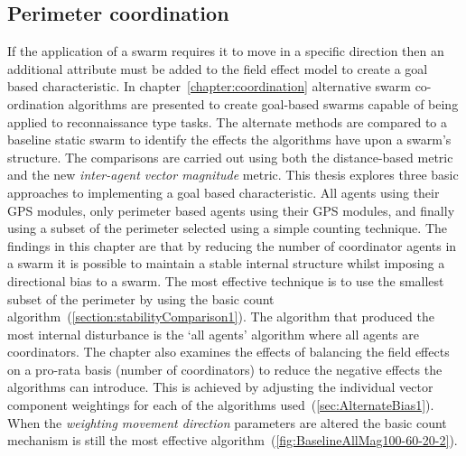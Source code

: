 \subsection{Perimeter coordination}
If the application of a swarm requires it to move in a specific direction then an additional attribute must be added to the field effect model to create a goal based characteristic. In chapter~\ref{chapter:coordination} alternative swarm co-ordination algorithms are presented to create goal-based swarms capable of being applied to reconnaissance type tasks. The alternate methods are compared to a baseline static swarm to identify the effects the algorithms have upon a swarm's structure. The comparisons are carried out using both the distance-based metric and the new \textit{inter-agent vector magnitude} metric. This thesis explores three basic approaches to implementing a goal based characteristic. All agents using their GPS modules, only perimeter based agents using their GPS modules, and finally using a subset of the perimeter selected using a simple counting technique. The findings in this chapter are that by reducing the number of coordinator agents in a swarm it is possible to maintain a stable internal structure whilst imposing a directional bias to a swarm. The most effective technique is to use the smallest subset of the perimeter by using the basic count algorithm~(\autoref{section:stabilityComparison1}). The algorithm that produced the most internal disturbance is the `all agents' algorithm where all agents are coordinators. The chapter also examines the effects of balancing the field effects on a pro-rata basis (number of coordinators) to reduce the negative effects the algorithms can introduce. This is achieved by adjusting the individual vector component weightings for each of the algorithms used~(\autoref{sec:AlternateBias1}). When the \textit{weighting movement direction} parameters are altered the basic count mechanism is still the most effective algorithm~(\autoref{fig:BaselineAllMag100-60-20-2}).

